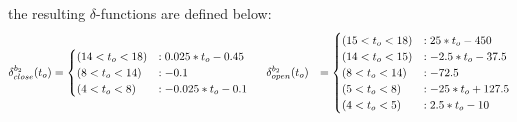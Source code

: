 \documentclass{article} %
\begin{document}
the resulting $\delta$-functions are defined below:
{\footnotesize
\begin{align}
\delta_{close}^{b_2}(t_o) &= 
\begin{cases}
 (14 < t_o< 18) &: 0.025*t_o - 0.45\\
 (8 < t_o< 14) &:  - 0.1\\
 (4 < t_o< 8) &: - 0.025*t_o -0.1\\
\end{cases}
\hspace{5mm} 
\delta_{open}^{b_2}(t_o) &= \begin{cases}
 (15 < t_o< 18) &: 25*t_o - 450\\
 (14 < t_o< 15) &: - 2.5*t_o - 37.5\\
 (8 < t_o< 14) &:  -72.5\\
 (5 < t_o< 8) &: - 25*t_o + 127.5\\
 (4 < t_o< 5) &:  2.5*t_o - 10\\
\end{cases}
\nonumber
\end{align}
}
\end{document}
